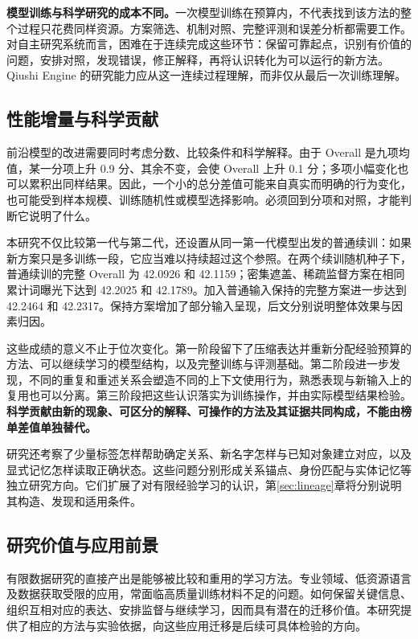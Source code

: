 \textbf{模型训练与科学研究的成本不同。}一次模型训练在预算内，不代表找到该方法的整个过程只花费同样资源。方案筛选、机制对照、完整评测和误差分析都需要工作。对自主研究系统而言，困难在于连续完成这些环节：保留可靠起点，识别有价值的问题，安排对照，发现错误，修正解释，再将认识转化为可以运行的新方法。Qiushi Engine 的研究能力应从这一连续过程理解，而非仅从最后一次训练理解。

\subsection{性能增量与科学贡献}

前沿模型的改进需要同时考虑分数、比较条件和科学解释。由于 Overall 是九项均值，某一分项上升 0.9 分、其余不变，会使 Overall 上升 0.1 分；多项小幅变化也可以累积出同样结果。因此，一个小的总分差值可能来自真实而明确的行为变化，也可能受到样本规模、训练随机性或模型选择影响。必须回到分项和对照，才能判断它说明了什么。

本研究不仅比较第一代与第二代，还设置从同一第一代模型出发的普通续训：如果新方案只是多训练一段，它应当难以持续超过这个参照。在两个续训随机种子下，普通续训的完整 Overall 为 42.0926 和 42.1159；密集遮盖、稀疏监督方案在相同累计词曝光下达到 42.2025 和 42.1789。加入普通输入保持的完整方案进一步达到 42.2464 和 42.2317。保持方案增加了部分输入呈现，后文分别说明整体效果与因素归因。

这些成绩的意义不止于位次变化。第一阶段留下了压缩表达并重新分配经验预算的方法、可以继续学习的模型结构，以及完整训练与评测基础。第二阶段进一步发现，不同的重复和重述关系会塑造不同的上下文使用行为，熟悉表现与新输入上的复用也可以分离。第三阶段把这些认识落实为训练操作，并由实际模型结果检验。\textbf{科学贡献由新的现象、可区分的解释、可操作的方法及其证据共同构成，不能由榜单差值单独替代。}

研究还考察了少量标签怎样帮助确定关系、新名字怎样与已知对象建立对应，以及显式记忆怎样读取正确状态。这些问题分别形成关系锚点、身份匹配与实体记忆等独立研究方向。它们扩展了对有限经验学习的认识，第\ref{sec:lineage}章将分别说明其构造、发现和适用条件。

\subsection{研究价值与应用前景}

有限数据研究的直接产出是能够被比较和重用的学习方法。专业领域、低资源语言及数据获取受限的应用，常面临高质量训练材料不足的问题。如何保留关键信息、组织互相对应的表达、安排监督与继续学习，因而具有潜在的迁移价值。本研究提供了相应的方法与实验依据，向这些应用迁移是后续可具体检验的方向。

